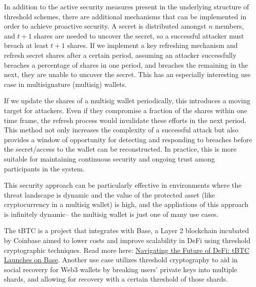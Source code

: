 \documentclass[12pt]{article}
\begin{document}
In addition to the active security measures present in the underlying structure of threshold schemes, there are additional mechanisms that can be implemented in order to achieve proactive security. A secret is distributed amongst \(n\) members, and \(t+1\) shares are needed to uncover the secret, so a successful attacker must breach at least \(t+1\) shares. If we implement a key refreshing mechanism and refresh secret shares after a certain period, assuming an attacker successfully breaches a percentage of shares in one period, and breaches the remaining in the next, they are unable to uncover the secret. This has an especially interesting use case in multisignature (multisig) wallets. 

If we update the shares of a multisig wallet periodically, this introduces a moving target for attackers. Even if they compromise a fraction of the shares within one time frame, the refresh process would invalidate these efforts in the next period. This method not only increases the complexity of a successful attack but also provides a window of opportunity for detecting and responding to breaches before the secret/access to the wallet can be reconstructed. In practice, this is more suitable for maintaining continuous security and ongoing trust among participants in the system.

This security approach can be particularly effective in environments where the threat landscape is dynamic and the value of the protected asset (like cryptocurrency in a multisig wallet) is high, and the appliations of this approach is infinitely dynamic-- the multisig wallet is just one of many use cases.

The tBTC is a project that integrates with Base, a Layer 2 blockchain incubated by Coinbase aimed to lower costs and improve scalability in DeFi using threshold cryptographic techniques. Read more here: \href{https://blog.threshold.network/navigating-the-future-of-defi-tbtc-launches-on-base/}{Navigating the Future of DeFi: tBTC Launches on Base}. Another use case utilizes threshold cryptography to aid in social recovery for Web3 wallets by breaking users' private keys into multiple shards, and allowing for recovery with a certain threshold of those shards. 
\end{document}
